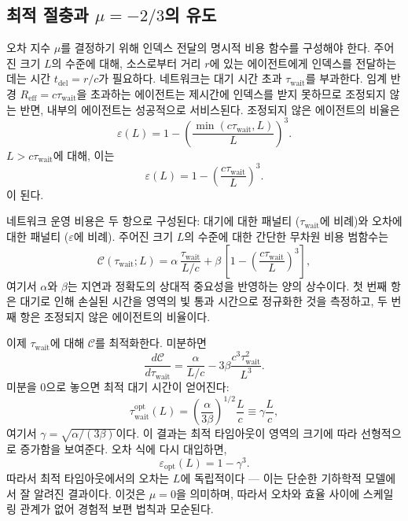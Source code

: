 \documentclass[11pt,a4paper]{article}
\begin{document}
	\subsection{최적 절충과 \(\mu = -2/3\)의 유도}
	오차 지수 \(\mu\)를 결정하기 위해 인덱스 전달의 명시적 비용 함수를 구성해야 한다. 주어진 크기 \(L\)의 수준에 대해, 소스로부터 거리 \(r\)에 있는 에이전트에게 인덱스를 전달하는 데는 시간 \(t_{\mathrm{del}} = r/c\)가 필요하다. 네트워크는 대기 시간 초과 \(\tau_{\mathrm{wait}}\)를 부과한다. 임계 반경 \(R_{\mathrm{eff}} = c\tau_{\mathrm{wait}}\)을 초과하는 에이전트는 제시간에 인덱스를 받지 못하므로 조정되지 않는 반면, 내부의 에이전트는 성공적으로 서비스된다. 조정되지 않은 에이전트의 비율은
	\[
	\varepsilon(L) = 1 - \left(\frac{\min(c\tau_{\mathrm{wait}},L)}{L}\right)^3.
	\]
	\(L > c\tau_{\mathrm{wait}}\)에 대해, 이는
	\[
	\varepsilon(L) = 1 - \left(\frac{c\tau_{\mathrm{wait}}}{L}\right)^3.
	\]
	이 된다.
	
	네트워크 운영 비용은 두 항으로 구성된다: 대기에 대한 패널티 (\(\tau_{\mathrm{wait}}\)에 비례)와 오차에 대한 패널티 (\(\varepsilon\)에 비례). 주어진 크기 \(L\)의 수준에 대한 간단한 무차원 비용 범함수는
	\begin{equation}
		\mathcal{C}(\tau_{\mathrm{wait}}; L) = \alpha\, \frac{\tau_{\mathrm{wait}}}{L/c} + \beta\,\left[1 - \left(\frac{c\tau_{\mathrm{wait}}}{L}\right)^3\right],
		\label{eq:cost}
	\end{equation}
	여기서 \(\alpha\)와 \(\beta\)는 지연과 정확도의 상대적 중요성을 반영하는 양의 상수이다. 첫 번째 항은 대기로 인해 손실된 시간을 영역의 빛 통과 시간으로 정규화한 것을 측정하고, 두 번째 항은 조정되지 않은 에이전트의 비율이다.
	
	이제 \(\tau_{\mathrm{wait}}\)에 대해 \(\mathcal{C}\)를 최적화한다. 미분하면
	\[
	\frac{d\mathcal{C}}{d\tau_{\mathrm{wait}}} = \frac{\alpha}{L/c} - 3\beta \frac{c^3\tau_{\mathrm{wait}}^2}{L^3}.
	\]
	미분을 0으로 놓으면 최적 대기 시간이 얻어진다:
	\[
	\tau_{\mathrm{wait}}^{\mathrm{opt}}(L) = \left(\frac{\alpha}{3\beta}\right)^{1/2} \frac{L}{c} \equiv \gamma \frac{L}{c},
	\]
	여기서 \(\gamma = \sqrt{\alpha/(3\beta)}\)이다. 이 결과는 최적 타임아웃이 영역의 크기에 따라 선형적으로 증가함을 보여준다. 오차 식에 다시 대입하면,
	\[
	\varepsilon_{\mathrm{opt}}(L) = 1 - \gamma^3.
	\]
	따라서 최적 타임아웃에서의 오차는 \(L\)에 독립적이다 — 이는 단순한 기하학적 모델에서 잘 알려진 결과이다. 이것은 \(\mu = 0\)을 의미하며, 따라서 오차와 효율 사이에 스케일링 관계가 없어 경험적 보편 법칙과 모순된다.
	
\end{document}
